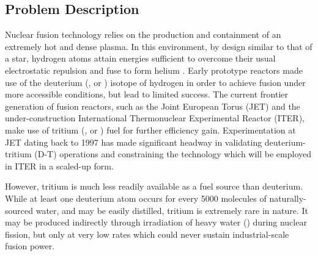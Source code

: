 \subsection{Problem Description}
\label{sec:problemdescription}

Nuclear fusion technology relies on the production and containment of an
extremely hot and dense plasma. In this environment, by design similar to that
of a star, hydrogen atoms attain energies sufficient to overcome their usual
electrostatic repulsion and fuse to form helium \cite{Hernandez2018}. Early prototype reactors
made use of the deuterium (, or ) isotope of hydrogen in order to
achieve fusion under more accessible conditions, but lead to limited success.
The current frontier generation of fusion reactors, such as the Joint European Torus (JET) and the
under-construction International Thermonuclear Experimental Reactor (ITER), make
use of tritium (, or ) fuel for further efficiency gain.
Experimentation at JET dating back to 1997 \cite{Keilhacker1999} has made significant headway in
validating deuterium-tritium (D-T) operations and constraining the technology
which will be employed in ITER in a scaled-up form.

However, tritium is much less readily available as a fuel source than deuterium.
While at least one deuterium atom occurs for every \num{5000} molecules of
naturally-sourced water, and may be easily distilled, tritium is extremely rare
in nature. It may be produced indirectly through irradiation of heavy water
() during nuclear fission, but only at very low rates which could
never sustain industrial-scale fusion power.

